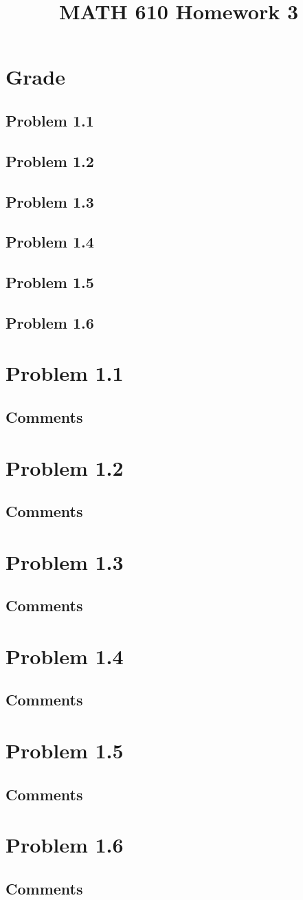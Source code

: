 \documentclass{article}
\title{MATH 610 Homework 3}
\author{
}
\date{}
\newcommand{\problem}[2]{
    \section*{Problem #1}
    {#2}
    \vfill
    \subsection*{Comments}
    \newpage
}
\begin{document}
\maketitle
\newpage

\section*{Grade}
\subsection*{Problem 1.1}
\subsection*{Problem 1.2}
\subsection*{Problem 1.3}
\subsection*{Problem 1.4}
\subsection*{Problem 1.5}
\subsection*{Problem 1.6}
\newpage

\problem{1.1}{
}

\problem{1.2}{
}

\problem{1.3}{
}

\problem{1.4}{
}

\problem{1.5}{
}

\problem{1.6}{
}
\end{document}
